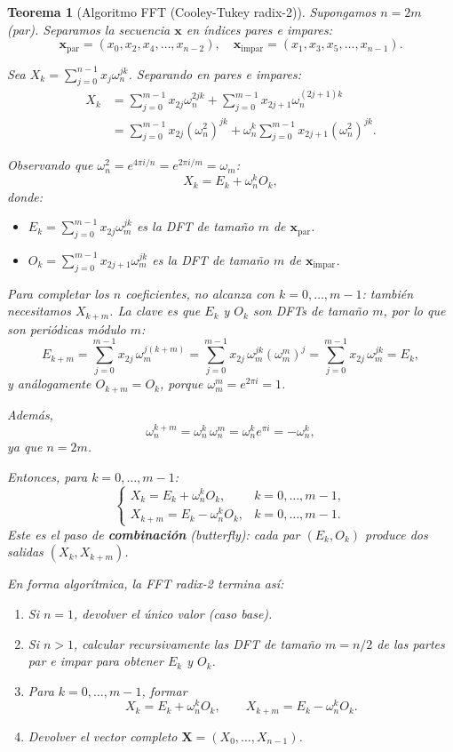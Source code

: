 \documentclass[a4paper,11pt]{report}
\newtheorem{theorem}{Teorema}[chapter]
\begin{document}
\begin{theorem}[Algoritmo FFT (Cooley-Tukey radix-2)]
Supongamos $n = 2m$ (par). Separamos la secuencia $\mathbf{x}$ en índices pares e impares:
\[
\mathbf{x}_{\text{par}} = (x_0, x_2, x_4, \ldots, x_{n-2}), \quad \mathbf{x}_{\text{impar}} = (x_1, x_3, x_5, \ldots, x_{n-1}).
\]

Sea $X_k = \sum_{j=0}^{n-1} x_j \omega_n^{jk}$. Separando en pares e impares:
\begin{align*}
X_k &= \sum_{j=0}^{m-1} x_{2j} \omega_n^{2jk} + \sum_{j=0}^{m-1} x_{2j+1} \omega_n^{(2j+1)k} \\
&= \sum_{j=0}^{m-1} x_{2j} (\omega_n^2)^{jk} + \omega_n^k \sum_{j=0}^{m-1} x_{2j+1} (\omega_n^2)^{jk}.
\end{align*}

Observando que $\omega_n^2 = e^{4\pi i/n} = e^{2\pi i/m} = \omega_m$:
\[
X_k = E_k + \omega_n^k O_k,
\]
donde:
\begin{itemize}
\item $E_k = \sum_{j=0}^{m-1} x_{2j} \omega_m^{jk}$ es la DFT de tamaño $m$ de $\mathbf{x}_{\text{par}}$.
\item $O_k = \sum_{j=0}^{m-1} x_{2j+1} \omega_m^{jk}$ es la DFT de tamaño $m$ de $\mathbf{x}_{\text{impar}}$.
\end{itemize}

Para completar los $n$ coeficientes, no alcanza con $k=0,\ldots,m-1$: también necesitamos $X_{k+m}$. La clave es que $E_k$ y $O_k$ son DFTs de tamaño $m$, por lo que son periódicas módulo $m$:
\[
E_{k+m} = \sum_{j=0}^{m-1} x_{2j}\,\omega_m^{j(k+m)}
= \sum_{j=0}^{m-1} x_{2j}\,\omega_m^{jk}(\omega_m^m)^j
= \sum_{j=0}^{m-1} x_{2j}\,\omega_m^{jk}
= E_k,
\]
y análogamente $O_{k+m}=O_k$, porque $\omega_m^m = e^{2\pi i}=1$.

Además,
\[
\omega_n^{k+m} = \omega_n^k\,\omega_n^m = \omega_n^k e^{\pi i} = -\omega_n^k,
\]
ya que $n=2m$.

Entonces, para $k=0,\ldots,m-1$:
\[
\begin{cases}
X_k = E_k + \omega_n^k O_k, & k = 0, \ldots, m-1, \\
X_{k+m} = E_k - \omega_n^k O_k, & k = 0, \ldots, m-1.
\end{cases}
\]
Este es el paso de \textbf{combinación} (butterfly): cada par $(E_k,O_k)$ produce dos salidas $(X_k,X_{k+m})$.

En forma algorítmica, la FFT radix-2 termina así:
\begin{enumerate}
\item Si $n=1$, devolver el único valor (caso base).
\item Si $n>1$, calcular recursivamente las DFT de tamaño $m=n/2$ de las partes par e impar para obtener $E_k$ y $O_k$.
\item Para $k=0,\ldots,m-1$, formar
\[
X_k = E_k + \omega_n^k O_k, \qquad X_{k+m} = E_k - \omega_n^k O_k.
\]
\item Devolver el vector completo $\mathbf{X}=(X_0,\ldots,X_{n-1})$.
\end{enumerate}
\end{theorem}
\end{document}
